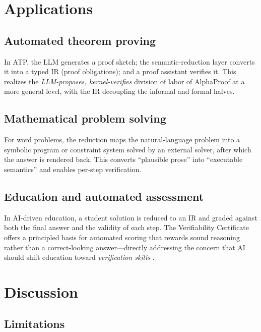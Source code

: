 \documentclass[11pt,a4paper]{article}
\theoremstyle{definition}
\theoremstyle{plain}
\begin{document}
\section{Applications}
\label{sec:applications}

\subsection{Automated theorem proving}
\label{sec:app-atp}

In ATP, the LLM generates a proof sketch; the semantic-reduction layer converts it into a typed IR
(proof obligations); and a proof assistant verifies it. This realizes the
\emph{LLM-proposes, kernel-verifies} division of labor of AlphaProof at a more general level, with the
IR decoupling the informal and formal halves.

\subsection{Mathematical problem solving}
\label{sec:app-solve}

For word problems, the reduction maps the natural-language problem into a symbolic program or
constraint system solved by an external solver, after which the answer is rendered back. This converts
``plausible prose'' into ``executable semantics'' and enables per-step verification.

\subsection{Education and automated assessment}
\label{sec:app-edu}

In AI-driven education, a student solution is reduced to an IR and graded against both the final answer
and the validity of each step. The Verifiability Certificate offers a principled basis for automated
scoring that rewards sound reasoning rather than a correct-looking answer---directly addressing the
concern that AI should shift education toward \emph{verification skills} \cite{chen2025reshaping}.

\section{Discussion}
\label{sec:discussion}

\subsection{Limitations}
\label{sec:limitations}
\end{document}
